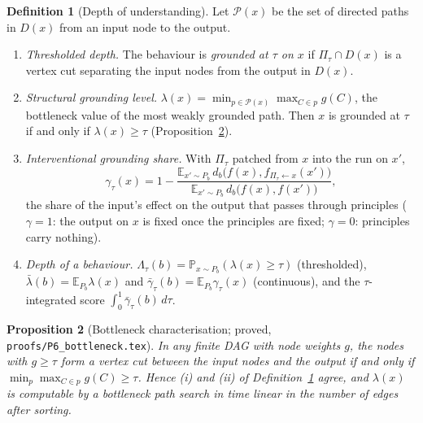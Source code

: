 \documentclass[11pt]{article}
\theoremstyle{definition}
\newtheorem{definition}{Definition}[section]
\theoremstyle{plain}
\newtheorem{proposition}[definition]{Proposition}
\theoremstyle{remark}
\newcommand{\E}{\mathbb{E}}
\renewcommand{\Pr}{\mathbb{P}}
\begin{document}
\begin{definition}[Depth of understanding]\label{def:depth}
Let $\mathcal{P}(x)$ be the set of directed paths in $D(x)$ from an input
node to the output.
\begin{enumerate}[label=(\roman*)]
\item \emph{Thresholded depth.} The behaviour is \emph{grounded at $\tau$ on
$x$} if $\Pi_\tau\cap D(x)$ is a vertex cut separating the input nodes from
the output in $D(x)$.
\item \emph{Structural grounding level.}
$\lambda(x)=\min_{p\in\mathcal{P}(x)}\max_{C\in p}g(C)$, the bottleneck value
of the most weakly grounded path. Then $x$ is grounded at $\tau$ if and only
if $\lambda(x)\ge\tau$ (Proposition~\ref{prop:bottleneck}).
\item \emph{Interventional grounding share.} With $\Pi_\tau$ patched from $x$
into the run on $x'$,
\[
\gamma_\tau(x)=1-\frac{\E_{x'\sim P_b}\,d_b\bigl(f(x),
f_{\Pi_\tau\leftarrow x}(x')\bigr)}{\E_{x'\sim P_b}\,d_b\bigl(f(x),f(x')\bigr)},
\]
the share of the input's effect on the output that passes through principles
($\gamma=1$: the output on $x$ is fixed once the principles are fixed;
$\gamma=0$: principles carry nothing).
\item \emph{Depth of a behaviour.}
$\Lambda_\tau(b)=\Pr_{x\sim P_b}(\lambda(x)\ge\tau)$ (thresholded),
$\bar\lambda(b)=\E_{P_b}\lambda(x)$ and
$\bar\gamma_\tau(b)=\E_{P_b}\gamma_\tau(x)$ (continuous), and the
$\tau$-integrated score $\int_0^1\bar\gamma_\tau(b)\,d\tau$.
\end{enumerate}
\end{definition}

\begin{proposition}[Bottleneck characterisation; proved,
\texttt{proofs/P6\_bottleneck.tex}]\label{prop:bottleneck}
In any finite DAG with node weights $g$, the nodes with $g\ge\tau$ form a
vertex cut between the input nodes and the output if and only if
$\min_{p}\max_{C\in p}g(C)\ge\tau$. Hence (i) and (ii) of
Definition~\ref{def:depth} agree, and $\lambda(x)$ is computable by a bottleneck path
search in time linear in the number of edges after sorting.
\end{proposition}
\end{document}
